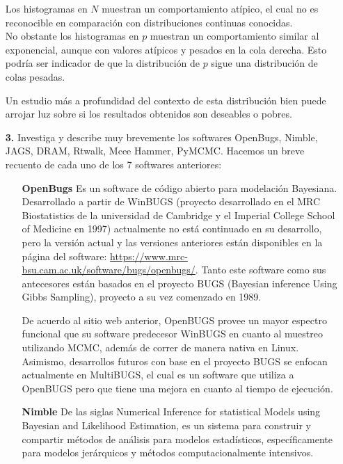 \documentclass[letterpaper]{article}
\newcommand{\1}{\mathds{1}}
\theoremstyle{definition}
\theoremstyle{definition}
\theoremstyle{definition}
\theoremstyle{definition}
\theoremstyle{definition}
\begin{document}
\begin{itemize}
    Los histogramas en $N$ muestran un comportamiento atípico, el cual no es reconocible 
    en comparación con distribuciones continuas conocidas.\\

    No obstante los histogramas en $p$ muestran un comportamiento similar al exponencial, aunque con 
    valores atípicos y pesados en la cola derecha. Esto podría ser indicador de que la distribución de $p$ 
    sigue una distribución de colas pesadas.
    \newline

    Un estudio más a profundidad del contexto de esta distribución bien puede arrojar 
    luz sobre si los resultados obtenidos son deseables o pobres.

    \item[\textbf{3.}] Investiga y describe muy brevemente los softwares OpenBugs, Nimble, JAGS, DRAM, Rtwalk, Mcee Hammer, PyMCMC.
    Hacemos un breve recuento de cada uno de los 7 softwares anteriores:
    \begin{enumerate}
        \item[\textbf{OpenBugs}] Es un software de código abierto para modelación Bayesiana. Desarrollado a partir de WinBUGS (proyecto desarrollado en el MRC Biostatistics de la universidad de Cambridge y 
        el Imperial College School of Medicine en 1997) actualmente no está continuado en su desarrollo, pero la versión actual y las versiones anteriores están disponibles en la página del software:
        \url{https://www.mrc-bsu.cam.ac.uk/software/bugs/openbugs/}. Tanto este software como sus antecesores están basados en el proyecto BUGS (Bayesian inference Using Gibbs Sampling), 
        proyecto a su vez comenzado en 1989.
        \newline

        De acuerdo al sitio web anterior, OpenBUGS provee un mayor espectro funcional que su software predecesor WinBUGS en cuanto 
        al muestreo utilizando MCMC, además de correr de manera nativa en Linux. Asimismo, desarrollos futuros con base en el 
        proyecto BUGS se enfocan actualmente en MultiBUGS, el cual es un software que utiliza a OpenBUGS pero que 
        tiene una mejora en cuanto al tiempo de ejecución.

        \item[\textbf{Nimble}] De las siglas Numerical Inference for statistical Models using Bayesian and Likelihood Estimation, 
        es un sistema para construir y compartir métodos de análisis para 
        modelos estadísticos, específicamente para modelos jerárquicos y métodos computacionalmente intensivos.
        \newline


\end{enumerate}
\end{itemize}
\end{document}
